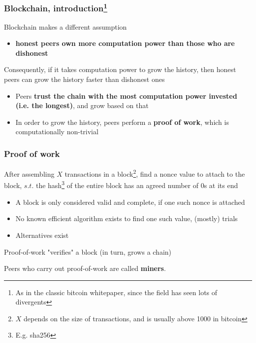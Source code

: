 \documentclass{beamer}
\begin{document}
\begin{frame}
\frametitle{Blockchain, introduction\footnote{As in the classic bitcoin whitepaper, since the field has seen lots of divergents}}

Blockchain makes a different assumption
\begin{itemize}
  \item \textbf{honest peers own more computation power than those who are dishonest}
\end{itemize}

\vspace{0.2in}

Consequently, if it takes computation power to grow the history, then honest peers can grow the history faster than dishonest ones
\begin{itemize}
  \item Peers \textbf{trust the chain with the most computation power invested (i.e. the longest)}, and grow based on that
  \item In order to grow the history, peers perform a \textbf{proof of work}, which is computationally non-trivial
\end{itemize}

\end{frame}

\begin{frame}
\frametitle{Proof of work}

After assembling $X$ transactions in a block\footnote{$X$ depends on the size of transactions, and is usually above 1000 in bitcoin}, find a nonce value to attach to the block, $s.t.$ the hash\footnote{E.g. sha256} of the entire block has an agreed number of $0$s at its end
\begin{itemize}
  \item A block is only considered valid and complete, if one such nonce is attached
  \item No known efficient algorithm exists to find one such value, (mostly) trials
  \item Alternatives exist
\end{itemize}

\vspace{0.2in}
Proof-of-work "verifies" a block (in turn, grows a chain)

\vspace{0.2in}
Peers who carry out proof-of-work are called \textbf{miners}.

\end{frame}
\end{document}
